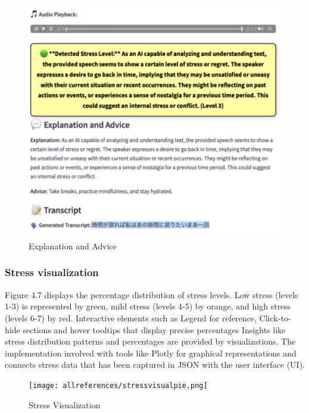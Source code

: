 \documentclass[Arial,12pt,openright,twoside]{book}
\begin{document}
\begin{figure}[htbp!]
    \centering
    \includegraphics[width=1.0\columnwidth]{advice4.png}
    \caption{Explanation and Advice}
    \label{fig:system_architecture}
\end{figure} 
\vspace{10pt} %
  \subsubsection{ Stress visualization}
Figure 4.7 displays the percentage distribution of stress levels. Low stress (levels 1-3) is represented by green, mild stress (levels 4-5) by orange, and high stress (levels 6-7) by red. Interactive elements such as Legend for reference, Click-to-hide sections and hover tooltips that display precise percentages Insights like stress distribution patterns and percentages are provided by visualizations.  The implementation involved with tools like Plotly for graphical representations and connects stress data that has been captured in JSON with the user interface (UI). 
\vspace{10pt} %
\begin{figure}[htbp!]
    \centering
    \texttt{[image: allreferences/stressvisualpie.png]}
    \caption{Stress Visualization}
    \label{fig:system_architecture}
\end{figure}
\vspace{10pt} %
\end{document}
